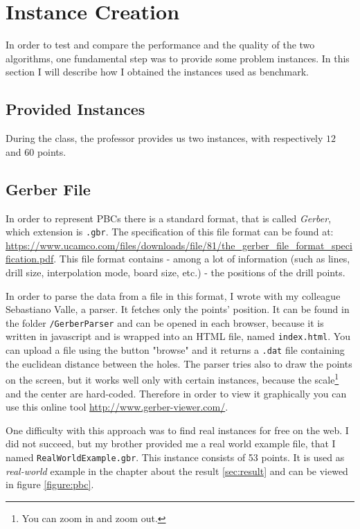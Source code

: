 \section{Instance Creation}
In order to test and compare the performance and the quality of the two algorithms, one fundamental step
was to provide some problem instances.
In this section I will describe how I obtained the instances
used as benchmark.
\subsection{Provided Instances}
During the class, the professor provides us two instances, with respectively $12$ and $60$ points.
\subsection{Gerber File}
\label{sec:Gerber}

In order to represent PBCs there is a standard format, that is called \emph{Gerber}, which extension is \verb|.gbr|.
The specification of this file format can be found at: \url{https://www.ucamco.com/files/downloads/file/81/the_gerber_file_format_specification.pdf}. This file format
contains - among a lot of information (such as lines, drill size, interpolation mode, board size, etc.) -
the positions of the drill points.


In order to parse the data from a file in this format, I wrote with my colleague Sebastiano Valle, a parser.
It fetches only the points' position. It can be found in the folder \verb|/GerberParser| and can be opened in each browser, because it is written in javascript and is wrapped into an HTML file, named \verb|index.html|.
You can upload a file using the button "browse" and it returns a \verb|.dat| file containing the euclidean distance between the holes.
The parser tries also to draw the points on the screen, but it works well only with certain instances, because the scale\footnote{You can zoom in and zoom out.} and the center are hard-coded. Therefore in order to view it graphically
you can use this online tool \url{http://www.gerber-viewer.com/}.

One difficulty with this approach was to find real instances for free on the web. I did not succeed, but my brother provided me a real world example file, that I named
\verb|RealWorldExample.gbr|. 
This instance consists of 53 points. It is used as \emph{real-world} example in the chapter about the result \ref{sec:result} and can be viewed in figure \ref{figure:pbc}. 


